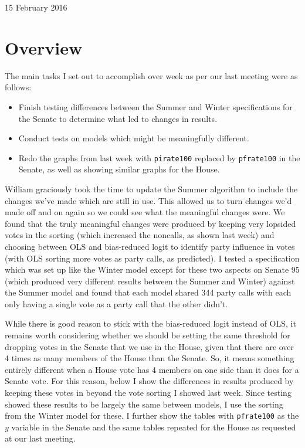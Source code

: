 \documentclass[12pt]{article}
\begin{document}
\begin{center}
\Large 15 February 2016
\end{center}

\section{Overview}

The main tasks I set out to accomplish over week as per our last meeting were as follows:

\begin{itemize}
	\item Finish testing differences between the Summer and Winter specifications for the Senate to determine what led to changes in results.
	
	\item Conduct tests on models which might be meaningfully different.
	
	\item Redo the graphs from last week with \verb|pirate100| replaced by \verb|pfrate100| in the Senate, as well as showing similar graphs for the House.
\end{itemize}

\noindent
William graciously took the time to update the Summer algorithm to include the changes we've made which are still in use. This allowed us to turn changes we'd made off and on again so we could see what the meaningful changes were. We found that the truly meaningful changes were produced by keeping very lopsided votes in the sorting (which increased the noncalls, as shown last week) and choosing between OLS and bias-reduced logit to identify party influence in votes (with OLS sorting more votes as party calls, as predicted). I tested a specification which was set up like the Winter model except for these two aspects on Senate 95 (which produced very different results between the Summer and Winter) against the Summer model and found that each model shared 344 party calls with each only having a single vote as a party call that the other didn't.

While there is good reason to stick with the bias-reduced logit instead of OLS, it remains worth considering whether we should be setting the same threshold for dropping votes in the Senate that we use in the House, given that there are over 4 times as many members of the House than the Senate. So, it means something entirely different when a House vote has 4 members on one side than it does for a Senate vote. For this reason, below I show the differences in results produced by keeping these votes in beyond the vote sorting I showed last week. Since testing showed these results to be largely the same between models, I use the sorting from the Winter model for these. I further show the tables with \verb|pfrate100| as the $y$ variable in the Senate and the same tables repeated for the House as requested at our last meeting.
\end{document}
